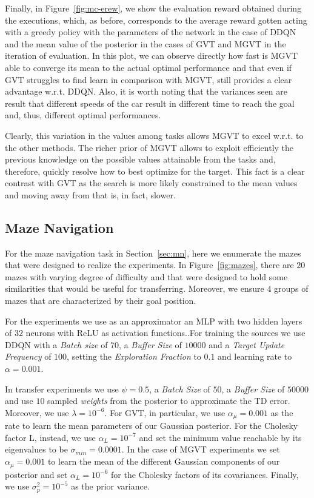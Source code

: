 \documentclass{article}
\begin{document}
Finally, in Figure~\ref{fig:mc-erew}, we show the evaluation reward obtained during the executions, which, as before, corresponds to the average reward gotten acting with a greedy policy with the parameters of the network in the case of DDQN and the mean value of the posterior in the cases of GVT and MGVT in the iteration of evaluation.  In this plot, we can observe directly how fast is MGVT able to converge its mean to the actual optimal performance and that even if GVT struggles to find learn in comparison with MGVT, still provides a clear advantage w.r.t. DDQN. Also, it is worth noting that the variances seen are result that different speeds of the car result in different time to reach the goal and, thus, different optimal performances.

Clearly, this variation in the values among tasks allows MGVT to excel w.r.t. to the other methods. The richer prior of MGVT allows to exploit efficiently the previous knowledge on the possible values attainable from the tasks and, therefore, quickly resolve how to best optimize for the target. This fact is a clear contrast with GVT as the search is more likely constrained to the mean values and moving away from that is, in fact, slower.

\subsection{Maze Navigation}

For the maze navigation task in Section~\ref{sec:mn}, here we enumerate the mazes that were designed to realize the experiments. In Figure~\ref{fig:mazes}, there are $20$ mazes with varying degree of difficulty and that were designed to hold some similarities that would be useful for transferring. Moreover, we ensure $4$ groups of mazes that are characterized by their goal position. 

For the experiments we use as an approximator an MLP with two hidden layers of $32$ neurons with ReLU as activation functions..For training the sources we use DDQN with a \textit{Batch size} of $70$, a \textit{Buffer Size} of $10000$ and a \textit{Target Update Frequency} of $100$, setting the \textit{Exploration Fraction} to $0.1$ and learning rate to $\alpha=0.001$.

In transfer experiments we use $\psi=0.5$, a \textit{Batch Size} of $50$, a \textit{Buffer Size} of $50000$ and use $10$ sampled \textit{weights} from the posterior to approximate the TD error. Moreover, we use $\lambda=10^{-6}$. For GVT, in particular, we use $\alpha_{\mu}=0.001$ as the rate to learn the mean parameters of our Gaussian posterior. For the Cholesky factor L, instead, we use $\alpha_{L}=10^{-7}$ and set the minimum value reachable by its eigenvalues to be $\sigma_{min}=0.0001$. In the case of MGVT experiments we set $\alpha_{\mu}=0.001$ to learn the mean of the different Gaussian components of our posterior and set $\alpha_{L}=10^{-6}$ for the Cholesky factors of its covariances. Finally, we use $\sigma_p^2=10^{-5}$ as the prior variance.
\end{document}

